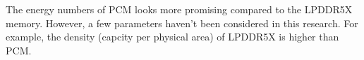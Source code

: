 \documentclass[11pt]{report}
\begin{document}
The energy numbers of PCM looks more promising compared to the LPDDR5X memory.
However, a few parameters haven't been considered in this research.
For example, the density (capcity per physical area) of LPDDR5X is higher than PCM.

\section{}
% 
% 
% 
% 

% 
% 
% 
% 
% 
% 
% 
% 
% 




% 


% 
% 
% 
% 
% 
% 
% 
% 

\newpage
\printbibliography[heading=bibintoc]
\end{document}

